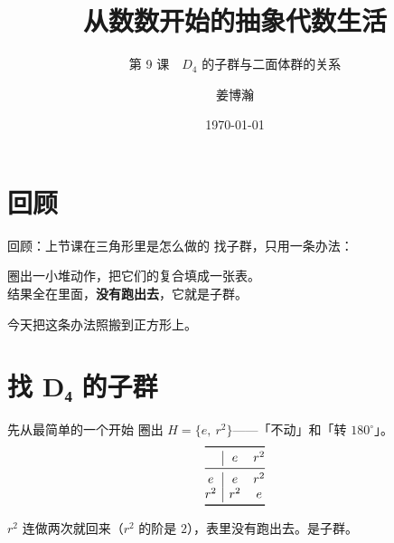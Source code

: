 \documentclass[10pt]{beamer}
\title{从数数开始的抽象代数生活}
\subtitle{第 9 课　\(D_4\) 的子群与二面体群的关系}
\author{姜博瀚}
\institute{厦门大学附属实验中学}
\date{\today}
\begin{document}
\begin{frame}
  \titlepage
\end{frame}

\section{回顾}

\begin{frame}{回顾：上节课在三角形里是怎么做的}
  找子群，只用一条办法：
  \begin{block}{}
    圈出一小堆动作，把它们的复合填成一张表。\\[2pt]
    结果全在里面，\textbf{没有跑出去}，它就是子群。
  \end{block}
  \pause
  \begin{center}
    {\large 今天把这条办法照搬到正方形上。}
  \end{center}
\end{frame}

\section{找 D₄ 的子群}

\begin{frame}{先从最简单的一个开始}
  圈出 \(H=\{e,\ r^2\}\)——「不动」和「转 \(180^\circ\)」。
  \pause
  \[
  \begin{array}{@{}c|cc@{}}
    \toprule
    & e & r^2 \\
    \midrule
    e & e & r^2 \\
    r^2 & r^2 & e \\
    \bottomrule
  \end{array}
  \]
  \pause
  \begin{center}
    \(r^2\) 连做两次就回来（\(r^2\) 的阶是 \(2\)），表里没有跑出去。\quad 是子群。
  \end{center}
\end{frame}
\end{document}

